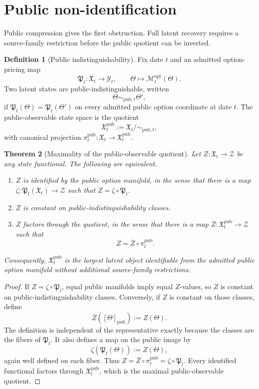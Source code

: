 \documentclass[11pt,a4paper]{amsart}
\theoremstyle{plain}
\newtheorem{theorem}{Theorem}[section]
\theoremstyle{definition}
\newtheorem{definition}[theorem]{Definition}
\theoremstyle{remark}
\newcommand{\cM}{\mathcal{M}}
\newcommand{\cY}{\mathcal{Y}}
\newcommand{\cZ}{\mathcal{Z}}
\begin{document}
\section{Public non-identification}\label{sec:nonidentification}

Public compression gives the first obstruction.  Full latent recovery requires a source-family
restriction before the public quotient can be inverted.

\begin{definition}[Public indistinguishability]\label{def:public-indistinguishability}
Fix date \(t\) and an admitted option-pricing map
\[
        \mathfrak P_t:\mathfrak X_t\to\cY_t,
        \qquad
        \Theta\mapsto\cM_t^{\mathrm{opt}}(\Theta).
\]
Two latent states are public-indistinguishable, written
\[
        \Theta\sim_{\mathrm{pub},t}\Theta',
\]
if \(\mathfrak P_t(\Theta)=\mathfrak P_t(\Theta')\) on every admitted public option coordinate at date \(t\).  The
public-observable state space is the quotient
\[
        \mathfrak X_t^{\mathrm{pub}}
        :=
        \mathfrak X_t/\!\sim_{\mathrm{pub},t},
\]
with canonical projection \(\pi_t^{\mathrm{pub}}:\mathfrak X_t\to\mathfrak X_t^{\mathrm{pub}}\).
\end{definition}

\begin{theorem}[Maximality of the public-observable quotient]\label{thm:public-quotient-maximality}
Let \(Z:\mathfrak X_t\to\cZ\) be any state functional.  The following are equivalent.
\begin{enumerate}[leftmargin=2em]
\item \(Z\) is identified by the public option manifold, in the sense that there is a map
\(\zeta:\mathfrak P_t(\mathfrak X_t)\to\cZ\) such that \(Z=\zeta\circ \mathfrak P_t\).
\item \(Z\) is constant on public-indistinguishability classes.
\item \(Z\) factors through the quotient, in the sense that there is a map
\(\bar Z:\mathfrak X_t^{\mathrm{pub}}\to\cZ\) such that
\[
        Z=\bar Z\circ\pi_t^{\mathrm{pub}}.
\]
\end{enumerate}
Consequently, \(\mathfrak X_t^{\mathrm{pub}}\) is the largest latent object identifiable from
the admitted public option manifold without additional source-family restrictions.
\end{theorem}

\begin{proof}
If \(Z=\zeta\circ \mathfrak P_t\), equal public manifolds imply equal \(Z\)-values, so \(Z\) is constant on
public-indistinguishability classes.  Conversely, if \(Z\) is constant on those classes, define
\[
        \bar Z([\Theta]_{\mathrm{pub}}):=Z(\Theta).
\]
The definition is independent of the representative exactly because the classes are the fibers of
\(\mathfrak P_t\).  It also defines a map on the public image by
\[
        \zeta(\mathfrak P_t(\Theta)):=Z(\Theta),
\]
again well defined on each fiber.  Thus
\(Z=\bar Z\circ\pi_t^{\mathrm{pub}}=\zeta\circ \mathfrak P_t\).  Every identified functional factors
through \(\mathfrak X_t^{\mathrm{pub}}\), which is the maximal public-observable quotient.
\end{proof}
\end{document}
